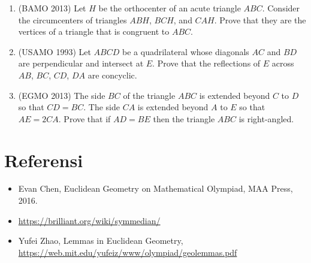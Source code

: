 \documentclass[11pt]{scrartcl}
\begin{document}
\begin{enumerate}[resume]
    \item (BAMO 2013) Let $H$ be the orthocenter of an acute triangle $ABC$. Consider the circumcenters of triangles $ABH$, $BCH$, and $CAH$. Prove that they are the vertices of a triangle that is congruent to $ABC$.
    \item (USAMO 1993) Let $ABCD$ be a quadrilateral whose diagonals $AC$ and $BD$ are perpendicular and intersect at $E$. Prove that the reflections of $E$ across $AB$, $BC$, $CD$, $DA$ are concyclic.
    \item (EGMO 2013) The side $BC$ of the triangle $ABC$ is extended beyond $C$ to $D$ so that $CD= BC$. The side $CA$ is extended beyond $A$ to $E$ so that $AE= 2CA$. Prove that if $AD= BE$ then the triangle $ABC$ is right-angled.
\end{enumerate}
\section{Referensi}
\begin{itemize}
    \item Evan Chen, Euclidean Geometry on Mathematical Olympiad, MAA Press, 2016.
    \item \url{https://brilliant.org/wiki/symmedian/}
    \item Yufei Zhao, Lemmas in Euclidean Geometry, \url{https://web.mit.edu/yufeiz/www/olympiad/geolemmas.pdf}
\end{itemize}
\end{document}
